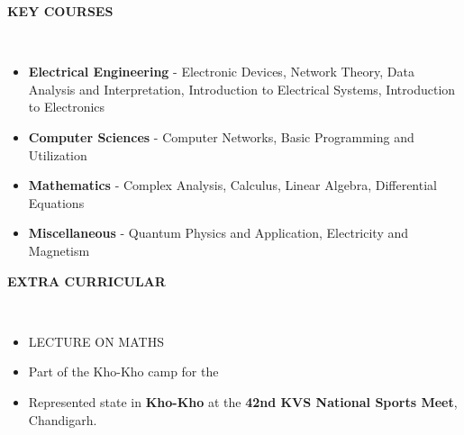 \documentclass[a4paper,10pt]{article}
\newcommand{\lsep}{-0.5cm}
\newcommand{\resheading}[1]{{\small \colorbox{mygrey}{\begin{minipage}{0.975\textwidth}{\textbf{#1 \vphantom{p\^{E}}}}\end{minipage}}}}
\begin{document}
\resheading{\textbf{KEY COURSES} }\\[\lsep]
\begin{itemize}
\setlength\itemsep{0.1em}
\item \noindent \textbf{Electrical Engineering} - Electronic Devices, Network Theory, Data Analysis and Interpretation, Introduction to Electrical Systems, Introduction to Electronics
\item \noindent \textbf{Computer Sciences} - Computer Networks, Basic Programming and Utilization
\item \noindent \textbf{Mathematics} - Complex Analysis, Calculus, Linear Algebra, Differential Equations
\item \noindent \textbf{Miscellaneous} - Quantum Physics and Application, Electricity and Magnetism

\end{itemize}

\resheading{\textbf{EXTRA CURRICULAR} }\\[\lsep]
\begin{itemize}
\setlength\itemsep{0.1em}
\item \noindent LECTURE ON MATHS
\item \noindent Part of the Kho-Kho camp for the 
\item \noindent Represented state in \textbf{Kho-Kho} at the \textbf{42nd KVS National Sports Meet}, Chandigarh.


\end{itemize}
\end{document}
